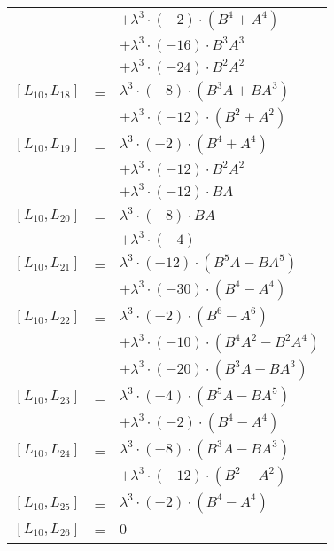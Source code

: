 \documentclass{article}
\begin{document}
\begin{center}
\begin{longtable}{lll}
 & & $ + {\lambda}^3{\cdot}(-2){\cdot}(B^{4}+A^{4})$ \\*
 & & $ + {\lambda}^3{\cdot}(-16){\cdot}B^{3}A^{3}$ \\*
 & & $ + {\lambda}^3{\cdot}(-24){\cdot}B^{2}A^{2}$ \\
$[L_{10},L_{18}]$ & = & ${\lambda}^3{\cdot}(-8){\cdot}(B^{3}A+BA^{3})$ \\*
 & & $ + {\lambda}^3{\cdot}(-12){\cdot}(B^{2}+A^{2})$ \\
$[L_{10},L_{19}]$ & = & ${\lambda}^3{\cdot}(-2){\cdot}(B^{4}+A^{4})$ \\*
 & & $ + {\lambda}^3{\cdot}(-12){\cdot}B^{2}A^{2}$ \\*
 & & $ + {\lambda}^3{\cdot}(-12){\cdot}BA$ \\
$[L_{10},L_{20}]$ & = & ${\lambda}^3{\cdot}(-8){\cdot}BA$ \\*
 & & $ + {\lambda}^3{\cdot}(-4)$ \\
$[L_{10},L_{21}]$ & = & ${\lambda}^3{\cdot}(-12){\cdot}(B^{5}A-BA^{5})$ \\*
 & & $ + {\lambda}^3{\cdot}(-30){\cdot}(B^{4}-A^{4})$ \\
$[L_{10},L_{22}]$ & = & ${\lambda}^3{\cdot}(-2){\cdot}(B^{6}-A^{6})$ \\*
 & & $ + {\lambda}^3{\cdot}(-10){\cdot}(B^{4}A^{2}-B^{2}A^{4})$ \\*
 & & $ + {\lambda}^3{\cdot}(-20){\cdot}(B^{3}A-BA^{3})$ \\
$[L_{10},L_{23}]$ & = & ${\lambda}^3{\cdot}(-4){\cdot}(B^{5}A-BA^{5})$ \\*
 & & $ + {\lambda}^3{\cdot}(-2){\cdot}(B^{4}-A^{4})$ \\
$[L_{10},L_{24}]$ & = & ${\lambda}^3{\cdot}(-8){\cdot}(B^{3}A-BA^{3})$ \\*
 & & $ + {\lambda}^3{\cdot}(-12){\cdot}(B^{2}-A^{2})$ \\
$[L_{10},L_{25}]$ & = & ${\lambda}^3{\cdot}(-2){\cdot}(B^{4}-A^{4})$ \\
$[L_{10},L_{26}]$ & = & $ 0 $ \\
\end{longtable}

\end{center}
\end{document}
